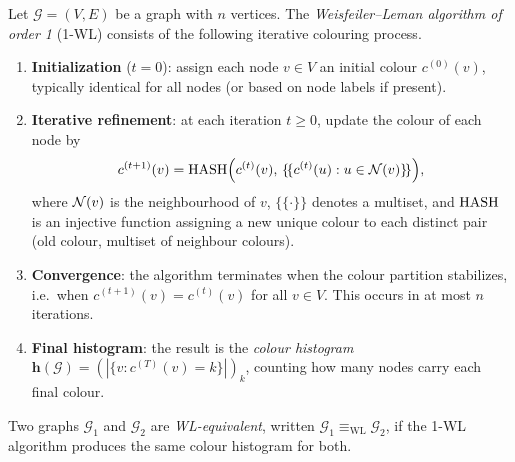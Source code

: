 \begin{definition}
\label{def:priors:wl}
Let $\mathcal{G} = (V, E)$ be a graph with $n$ vertices. The
\emph{Weisfeiler--Leman algorithm of order 1} (1-WL) consists of the following
iterative colouring process.
\begin{enumerate}
\item \textbf{Initialization} ($t = 0$): assign each node $v \in V$ an initial
colour $c^{(0)}(v)$, typically identical for all nodes (or based on node labels
if present).
\item \textbf{Iterative refinement}: at each iteration $t \ge 0$, update the
colour of each node by
\[
  c^{(t+1)}(v) = \operatorname{HASH}\Bigl(c^{(t)}(v),\,
      \{\!\{ c^{(t)}(u) : u \in \mathcal{N}(v) \}\!\}\Bigr),
\]
where $\mathcal{N}(v)$ is the neighbourhood of $v$, $\{\!\{\cdot\}\!\}$ denotes a
multiset, and $\operatorname{HASH}$ is an injective function assigning a new unique colour to
each distinct pair (old colour, multiset of neighbour colours).
\item \textbf{Convergence}: the algorithm terminates when the colour partition
stabilizes, i.e.\ when $c^{(t+1)}(v) = c^{(t)}(v)$ for all $v \in V$. This occurs
in at most $n$ iterations.
\item \textbf{Final histogram}: the result is the \emph{colour histogram}
$\mathbf{h}(\mathcal{G}) = (|\{v : c^{(T)}(v) = k\}|)_k$, counting how many nodes
carry each final colour.
\end{enumerate}
\end{definition}

\begin{definition}[WL-equivalence]
\label{def:priors:wl-equivalence}
Two graphs $\mathcal{G}_1$ and $\mathcal{G}_2$ are \emph{WL-equivalent}, written
$\mathcal{G}_1 \equiv_{\mathrm{WL}} \mathcal{G}_2$, if the 1-WL algorithm produces
the same colour histogram for both.
\end{definition}

